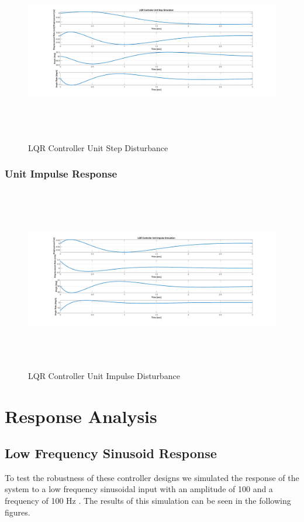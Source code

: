 \documentclass[titlepage]{article}
\begin{document}
\begin{figure}[H]
\center
\includegraphics[width=16cm, height=8cm]{lqr_unit_step.png}
\caption{LQR Controller Unit Step Disturbance}
\end{figure}

\subsubsection{Unit Impulse Response}

\begin{figure}[H]
\center
\includegraphics[width=16cm, height=8cm]{lqr_unit_impulse.png}
\caption{LQR Controller Unit Impulse Disturbance}
\end{figure}

\newpage
\section{Response Analysis}

\subsection{Low Frequency Sinusoid Response}
To test the robustness of these controller designs we simulated the response of the system to a low frequency sinusoidal input with an amplitude of 100  and a frequency of 100 Hz .
The results of this simulation can be seen in the following figures.
\end{document}

